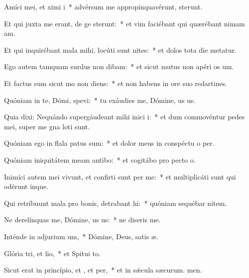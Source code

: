 \item Amíci mei, et ximi i~* advérsum me appropinquavérunt,  sterunt.
\item Et qui juxta me erant, de ge sterunt:~* et vim faciébant qui quærébant nimam am.
\item Et qui inquirébant mala mihi, locúti sunt nites:~* et dolos tota die metatur.
\item Ego autem tamquam surdus non dibam:~* et sicut mutus non apéri os um.
\item Et factus sum sicut mo non diens:~* et non habens in ore suo redartines.
\item Quóniam in te, Dómi, spevi:~* tu exáudies me, Dómine, us us.
\item Quia dixi: Nequándo supergáudeant mihi inici i:~* et dum commovéntur pedes mei, super me gna loti sunt.
\item Quóniam ego in flala patus sum:~* et dolor meus in conspéctu o per.
\item Quóniam iniquitátem meam antibo:~* et cogitábo pro pecto o.
\item Inimíci autem mei vivunt, et confirti sunt per me:~* et multiplicáti sunt qui odérunt  inque.
\item Qui retríbuunt mala pro bonis, detrabant hi:~* quóniam sequébar nitem.
\item Ne derelínquas me, Dómine, us us:~* ne diseris  me.
\item Inténde in adjurium um,~* Dómine, Deus, satis æ.
\item Glória tri, et lio,~* et Spitui to.
\item Sicut erat in princípio, et , et per,~* et in sǽcula sæcurum. men.
